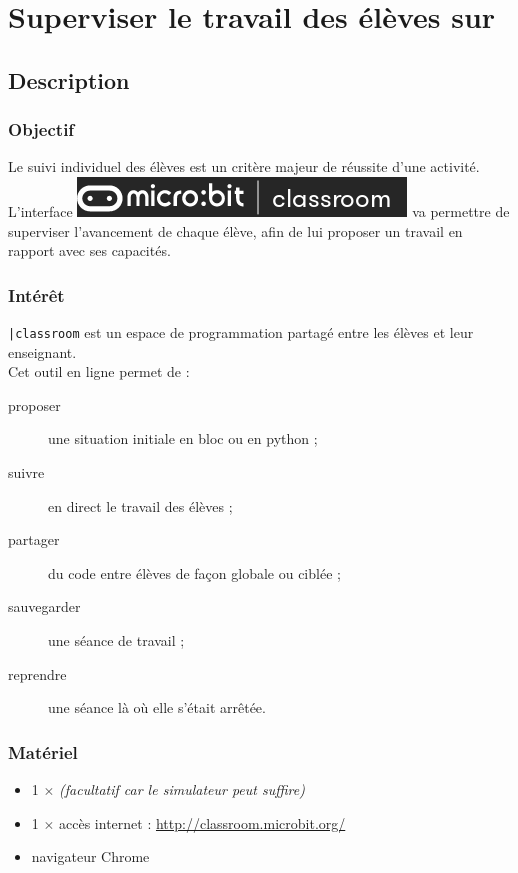 

\section{Superviser le travail des élèves sur \mb}


\subsection{Description}

\subsubsection{Objectif}


\begin{formule}
Le suivi individuel des élèves est un critère majeur de réussite d'une activité. 
L'interface \includegraphics[scale=0.3]{res/classroom_logo.png} va permettre de superviser 
l'avancement de chaque élève, afin de lui proposer un travail en rapport avec ses capacités.
\end{formule}


\subsubsection{Intérêt}

\mb \texttt{|classroom} est un espace de programmation partagé entre les élèves et leur enseignant.\\
Cet outil en ligne permet de :


\begin{description}
    \item [proposer] une situation initiale en bloc ou en python ;
    \item [suivre] en direct le travail des élèves ;
    \item [partager] du code entre élèves de façon globale ou ciblée ;
    \item [sauvegarder] une séance de travail ;
    \item [reprendre] une séance là où elle s'était arrêtée.
\end{description}


\subsubsection{Matériel}
\begin{itemize}
    \item 1 $\times$ \matosMb \emph{(facultatif car le simulateur peut suffire)}
    \item 1 $\times$ accès internet : \url{http://classroom.microbit.org/}
%   
    \item navigateur Chrome\textregistered
\end{itemize}


